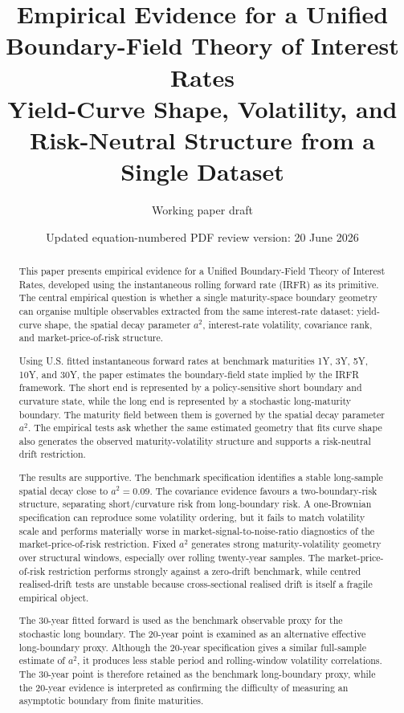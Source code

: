 \documentclass[11pt]{article}
\title{\textbf{Empirical Evidence for a Unified Boundary-Field Theory of Interest Rates}\\\large Yield-Curve Shape, Volatility, and Risk-Neutral Structure from a Single Dataset}
\author{Working paper draft}
\date{Updated equation-numbered PDF review version: 20 June 2026}
\numberwithin{equation}{section}
\begin{document}
\maketitle
\begin{abstract}
This paper presents empirical evidence for a Unified Boundary-Field Theory of Interest Rates, developed using the instantaneous rolling forward rate (IRFR) as its primitive. The central empirical question is whether a single maturity-space boundary geometry can organise multiple observables extracted from the same interest-rate dataset: yield-curve shape, the spatial decay parameter $a^2$, interest-rate volatility, covariance rank, and market-price-of-risk structure.

Using U.S. fitted instantaneous forward rates at benchmark maturities 1Y, 3Y, 5Y, 10Y, and 30Y, the paper estimates the boundary-field state implied by the IRFR framework. The short end is represented by a policy-sensitive short boundary and curvature state, while the long end is represented by a stochastic long-maturity boundary. The maturity field between them is governed by the spatial decay parameter $a^2$. The empirical tests ask whether the same estimated geometry that fits curve shape also generates the observed maturity-volatility structure and supports a risk-neutral drift restriction.

The results are supportive. The benchmark specification identifies a stable long-sample spatial decay close to $a^2=0.09$. The covariance evidence favours a two-boundary-risk structure, separating short/curvature risk from long-boundary risk. A one-Brownian specification can reproduce some volatility ordering, but it fails to match volatility scale and performs materially worse in market-signal-to-noise-ratio diagnostics of the market-price-of-risk restriction. Fixed $a^2$ generates strong maturity-volatility geometry over structural windows, especially over rolling twenty-year samples. The market-price-of-risk restriction performs strongly against a zero-drift benchmark, while centred realised-drift tests are unstable because cross-sectional realised drift is itself a fragile empirical object.

The 30-year fitted forward is used as the benchmark observable proxy for the stochastic long boundary. The 20-year point is examined as an alternative effective long-boundary proxy. Although the 20-year specification gives a similar full-sample estimate of $a^2$, it produces less stable period and rolling-window volatility correlations. The 30-year point is therefore retained as the benchmark long-boundary proxy, while the 20-year evidence is interpreted as confirming the difficulty of measuring an asymptotic boundary from finite maturities.
\end{abstract}
\end{document}
